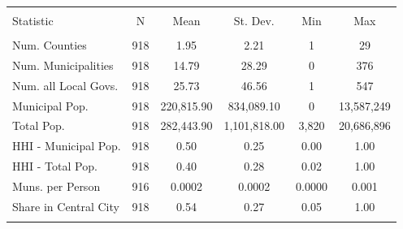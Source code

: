 
\begin{tabular}{@{\extracolsep{5pt}}lccccc} 
\\[-1.8ex]\hline 
\hline \\[-1.8ex] 
Statistic & \multicolumn{1}{c}{N} & \multicolumn{1}{c}{Mean} & \multicolumn{1}{c}{St. Dev.} & \multicolumn{1}{c}{Min} & \multicolumn{1}{c}{Max} \\ 
\hline \\[-1.8ex] 
Num. Counties & 918 & 1.95 & 2.21 & 1 & 29 \\ 
Num. Municipalities & 918 & 14.79 & 28.29 & 0 & 376 \\ 
Num. all Local Govs. & 918 & 25.73 & 46.56 & 1 & 547 \\ 
Municipal Pop. & 918 & 220,815.90 & 834,089.10 & 0 & 13,587,249 \\ 
Total Pop. & 918 & 282,443.90 & 1,101,818.00 & 3,820 & 20,686,896 \\ 
HHI - Municipal Pop. & 918 & 0.50 & 0.25 & 0.00 & 1.00 \\ 
HHI - Total Pop. & 918 & 0.40 & 0.28 & 0.02 & 1.00 \\ 
Muns. per Person & 916 & 0.0002 & 0.0002 & 0.0000 & 0.001 \\ 
Share in Central City & 918 & 0.54 & 0.27 & 0.05 & 1.00 \\ 
\hline \\[-1.8ex] 
\end{tabular} 
